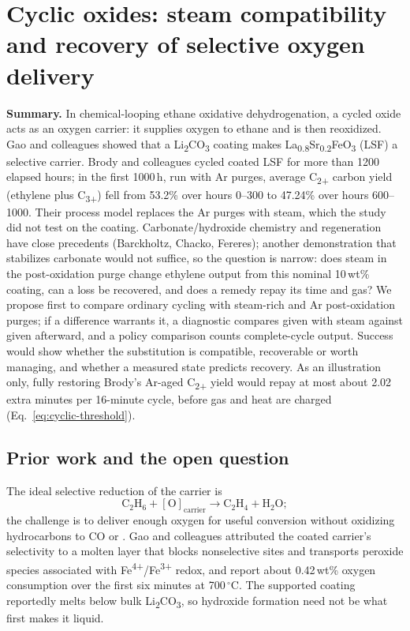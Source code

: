 \section{Cyclic oxides: steam compatibility and recovery of selective oxygen delivery}
\label{sec:cyclic}

\textbf{Summary.} In chemical-looping ethane oxidative dehydrogenation, a cycled oxide acts as an oxygen carrier: it supplies oxygen to ethane and is then reoxidized. Gao and colleagues showed that a Li\textsubscript{2}CO\textsubscript{3} coating makes La\textsubscript{0.8}Sr\textsubscript{0.2}FeO\textsubscript{3} (LSF) a selective carrier.\cite{gao2020} Brody and colleagues cycled coated LSF for more than 1200 elapsed hours; in the first 1000\,h, run with Ar purges, average C\textsubscript{2+} carbon yield (ethylene plus C\textsubscript{3+}) fell from 53.2\% over hours 0--300 to 47.24\% over hours 600--1000. Their process model replaces the Ar purges with steam, which the study did not test on the coating.\cite{brody2022} Carbonate/hydroxide chemistry and \COtwo{} regeneration have close precedents (Barckholtz,\cite{barckholtz2021} Chacko,\cite[ch.~4.1]{chacko2025thesis} Fereres\cite{fereres2018}); another demonstration that \COtwo{} stabilizes carbonate would not suffice, so the question is narrow: does steam in the post-oxidation purge change ethylene output from this nominal 10\,wt\% coating, can a loss be recovered, and does a remedy repay its time and gas? We propose first to compare ordinary cycling with steam-rich and Ar post-oxidation purges; if a difference warrants it, a diagnostic compares \COtwo{} given with steam against \COtwo{} given afterward, and a policy comparison counts complete-cycle output. Success would show whether the substitution is compatible, recoverable or worth managing, and whether a measured state predicts recovery. As an illustration only, fully restoring Brody's Ar-aged C\textsubscript{2+} yield would repay at most about 2.02 extra minutes per 16-minute cycle, before gas and heat are charged (Eq.~\ref{eq:cyclic-threshold}).

\subsection{Prior work and the open question}

The ideal selective reduction of the carrier is
\begin{equation}
 \mathrm{C_2H_6+[O]_{carrier}\longrightarrow C_2H_4+H_2O};
 \label{eq:cyclic-odh}
\end{equation}
the challenge is to deliver enough oxygen for useful conversion without oxidizing hydrocarbons to CO or \COtwo{}. Gao and colleagues attributed the coated carrier's selectivity to a molten layer that blocks nonselective sites and transports peroxide species associated with Fe\textsuperscript{4+}/Fe\textsuperscript{3+} redox, and report about 0.42\,wt\% oxygen consumption over the first six minutes at 700\,$^\circ$C. The supported coating reportedly melts below bulk Li\textsubscript{2}CO\textsubscript{3}, so hydroxide formation need not be what first makes it liquid.\cite{gao2020}

